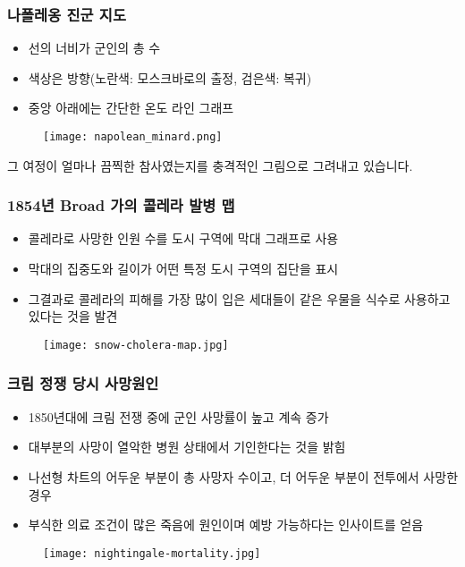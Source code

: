 \documentclass[10pt]{beamer}
\begin{document}
\begin{frame}
\frametitle{나폴레옹 진군 지도}
\begin{itemize}
	\item 선의 너비가 군인의 총 수
	\item 색상은 방향(노란색: 모스크바로의 출정, 검은색: 복귀)
	\item 중앙 아래에는 간단한 온도 라인 그래프
\end{itemize}
	\begin{figure}
		\texttt{[image: napolean\_minard.png]}
	\end{figure}
그 여정이 얼마나 끔찍한 참사였는지를 충격적인 그림으로 그려내고 있습니다.
\end{frame}

\begin{frame}
\frametitle{1854년 Broad 가의 콜레라 발병 맵}
\begin{itemize}
	\item 콜레라로 사망한 인원 수를 도시 구역에 막대 그래프로 사용
	\item 막대의 집중도와 길이가 어떤 특정 도시 구역의 집단을 표시
	\item 그결과로 콜레라의 피해를 가장 많이 입은 세대들이 같은 우물을 식수로 사용하고 있다는 것을 발견
\end{itemize}
	\begin{figure}
		\texttt{[image: snow-cholera-map.jpg]}
	\end{figure}
\end{frame}

\begin{frame}
\frametitle{크림 정쟁 당시 사망원인}
\begin{itemize}
	\item 1850년대에 크림 전쟁 중에 군인 사망률이 높고 계속 증가
	\item 대부분의 사망이 열악한 병원 상태에서 기인한다는 것을 밝힘
	\item 나선형 차트의 어두운 부분이 총 사망자 수이고, 더 어두운 부분이 전투에서 사망한 경우
	\item 부식한 의료 조건이 많은 죽음에 원인이며 예방 가능하다는 인사이트를 얻음
\end{itemize}
	\begin{figure}
		\texttt{[image: nightingale-mortality.jpg]}
	\end{figure}
\end{frame}
\end{document}
